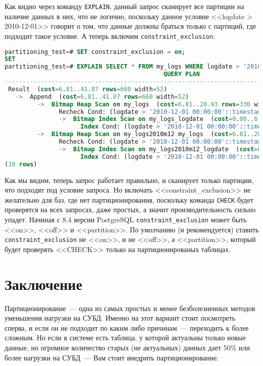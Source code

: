 Как видно через команду \lstinline!EXPLAIN!, данный запрос сканирует все партиции на наличие данных в них, что не логично, поскольку данное условие <<logdate > 2010-12-01>> говорит о том, что данные должны браться только с партиций, где подходит такое условие. А теперь включим \lstinline!constraint_exclusion!:

\begin{lstlisting}[language=SQL,label=lst:partitioning15,caption=<<constraint\_exclusion>> ON]
partitioning_test=# SET constraint_exclusion = on;
SET
partitioning_test=# EXPLAIN SELECT * FROM my_logs WHERE logdate > '2010-12-01';
                                            QUERY PLAN
---------------------------------------------------------------------------------------------------
 Result  (cost=6.81..41.87 rows=660 width=52)
   ->  Append  (cost=6.81..41.87 rows=660 width=52)
         ->  Bitmap Heap Scan on my_logs  (cost=6.81..20.93 rows=330 width=52)
               Recheck Cond: (logdate > '2010-12-01 00:00:00'::timestamp without time zone)
               ->  Bitmap Index Scan on my_logs_logdate  (cost=0.00..6.73 rows=330 width=0)
                     Index Cond: (logdate > '2010-12-01 00:00:00'::timestamp without time zone)
         ->  Bitmap Heap Scan on my_logs2010m12 my_logs  (cost=6.81..20.93 rows=330 width=52)
               Recheck Cond: (logdate > '2010-12-01 00:00:00'::timestamp without time zone)
               ->  Bitmap Index Scan on my_logs2010m12_logdate  (cost=0.00..6.73 rows=330 width=0)
                     Index Cond: (logdate > '2010-12-01 00:00:00'::timestamp without time zone)
(10 rows)
\end{lstlisting}

Как мы видим, теперь запрос работает правильно, и сканирует только партиции, что подходят под условие запроса. Но включать <<constraint\_exclusion>> не желательно для баз, где нет партиционирования, поскольку команда \lstinline!CHECK! будет проверятся на всех запросах, даже простых, а значит производительность сильно упадет. Начиная с 8.4 версии PostgreSQL \lstinline!constraint_exclusion! может быть <<on>>, <<off>> и <<partition>>. По умолчанию (и рекомендуется) ставить \lstinline!constraint_exclusion! не <<on>>, и не <<off>>, а <<partition>>, который будет проверять <<CHECK>> только на партиционированых таблицах.

\section{Заключение}

Партиционирование~--- одна из самых простых и менее безболезненных методов уменьшения нагрузки на СУБД. Именно на этот вариант стоит посмотреть сперва, и если он не подходит по каким либо причинам~--- переходить к более сложным. Но если в системе есть таблица, у которой актуальны только новые данные, но огромное количество старых (не актуальных) данных дает 50\% или более нагрузки на СУБД~--- Вам стоит внедрить партиционирование.